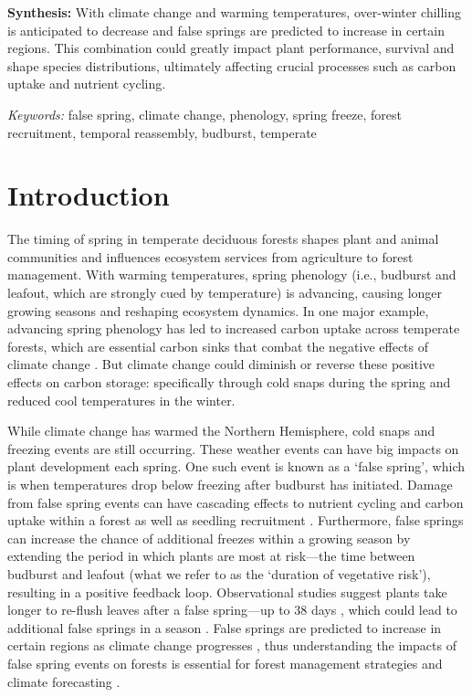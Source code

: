 \documentclass{article}\usepackage[]{graphicx}\usepackage[]{color}
\begin{document}
\textbf{Synthesis:} With climate change and warming temperatures, over-winter chilling is anticipated to decrease and false springs are predicted to increase in certain regions. This combination could greatly impact plant performance, survival and shape species distributions, ultimately affecting crucial processes such as carbon uptake and nutrient cycling.

\vspace{2ex}
\textit{Keywords:} false spring, climate change, phenology, spring freeze, forest recruitment, temporal reassembly, budburst, temperate

\section*{Introduction}
The timing of spring in temperate deciduous forests shapes plant and animal communities and influences ecosystem services from agriculture to forest management. With warming temperatures, spring phenology (i.e., budburst and leafout, which are strongly cued by temperature) is advancing, causing longer growing seasons \citep{Chuine2001} and reshaping ecosystem dynamics. In one major example, advancing spring phenology has led to increased carbon uptake across temperate forests, which are essential carbon sinks that combat the negative effects of climate change \citep{Keenan2014}. But climate change could diminish or reverse these positive effects on carbon storage: specifically through cold snaps during the spring and reduced cool temperatures in the winter.
  
While climate change has warmed the Northern Hemisphere, cold snaps and freezing events are still occurring. These weather events can have big impacts on plant development each spring. One such event is known as a `false spring', which is when temperatures drop below freezing \citep[][i.e., below -2.2$^{\circ}$C]{Schwartz2002} after budburst has initiated. Damage from false spring events can have cascading effects to nutrient cycling and carbon uptake within a forest as well as seedling recruitment \citep{Hufkens2012, Klosterman2018, Richardson2013}. Furthermore, false springs can increase the chance of additional freezes within a growing season by extending the period in which plants are most at risk---the time between budburst and leafout (what we refer to as the `duration of vegetative risk'), resulting in a positive feedback loop. Observational studies suggest plants take longer to re-flush leaves after a false spring---up to 38 days \citep{Augspurger2009, Augspurger2013, Gu2008, Menzel2015}, which could lead to additional false springs in a season \citep{Augspurger2009}. False springs are predicted to increase in certain regions as climate change progresses \citep{Ault2015, Liu2018, Zohner2020}, thus understanding the impacts of false spring events on forests is essential for forest management strategies and climate forecasting \citep{OBrien2019}. 
  
\end{document}
